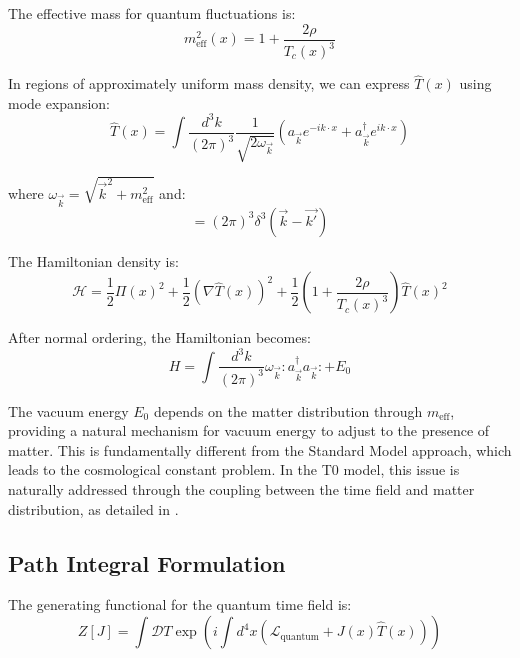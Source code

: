 \documentclass[12pt,a4paper]{article}
\begin{document}
	The effective mass for quantum fluctuations is:
	\begin{equation}
		m_{\text{eff}}^2(x) = 1 + \frac{2\rho}{T_c(x)^3}
		\label{eq:effective_mass}
	\end{equation}
	
	In regions of approximately uniform mass density, we can express $\hat{T}(x)$ using mode expansion:
	\begin{equation}
		\hat{T}(x) = \int \frac{d^3k}{(2\pi)^3} \frac{1}{\sqrt{2\omega_{\vec{k}}}} \left(a_{\vec{k}} e^{-ik \cdot x} + a_{\vec{k}}^{\dagger} e^{ik \cdot x}\right)
		\label{eq:mode_expansion}
	\end{equation}
	
	where $\omega_{\vec{k}} = \sqrt{\vec{k}^2 + m_{\text{eff}}^2}$ and:
	\begin{equation}
		[a_{\vec{k}}, a_{\vec{k'}}^{\dagger}] = (2\pi)^3 \delta^3(\vec{k} - \vec{k'})
		\label{eq:creation_annihilation}
	\end{equation}
	
	The Hamiltonian density is:
	\begin{equation}
		\mathcal{H} = \frac{1}{2}\Pi(x)^2 + \frac{1}{2}(\nabla \hat{T}(x))^2 + \frac{1}{2}\left(1 + \frac{2\rho}{T_c(x)^3}\right)\hat{T}(x)^2
		\label{eq:hamiltonian_density}
	\end{equation}
	
	After normal ordering, the Hamiltonian becomes:
	\begin{equation}
		H = \int \frac{d^3k}{(2\pi)^3} \omega_{\vec{k}} :a_{\vec{k}}^{\dagger}a_{\vec{k}}: + E_0
		\label{eq:hamiltonian}
	\end{equation}
	
	The vacuum energy $E_0$ depends on the matter distribution through $m_{\text{eff}}$, providing a natural mechanism for vacuum energy to adjust to the presence of matter. This is fundamentally different from the Standard Model approach, which leads to the cosmological constant problem. In the T0 model, this issue is naturally addressed through the coupling between the time field and matter distribution, as detailed in \cite{Pascher2025Energy}.
	
	\subsection{Path Integral Formulation}
	\label{subsec:path_integral}
	
	The generating functional for the quantum time field is:
	\begin{equation}
		Z[J] = \int \mathcal{D}T \exp\left(i\int d^4x (\mathcal{L}_{\text{quantum}} + J(x)\hat{T}(x))\right)
		\label{eq:generating_functional}
	\end{equation}
	
\end{document}
